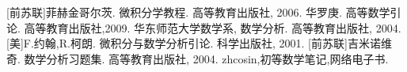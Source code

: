 
\begin{thebibliography}{99}
    [前苏联]菲赫金哥尔茨. 微积分学教程. 高等教育出版社, 2006.
   华罗庚. 高等数学引论. 高等教育出版社,2009.
    华东师范大学数学系, 数学分析. 高等教育出版社, 2004.
   [美]F.约翰,R.柯朗. 微积分与数学分析引论. 科学出版社, 2001.
   [前苏联]吉米诺维奇. 数学分析习题集. 高等教育出版社, 2004.
   zhcosin,初等数学笔记,网络电子书.
\end{thebibliography}



